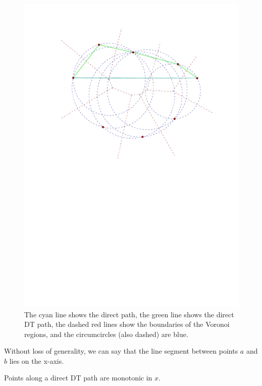 \documentclass{tufte-handout}
\begin{document}
\begin{figure}
  \includegraphics[scale=0.8]{figures/one-sided_path.pdf}
  \caption{The cyan line shows the direct path, the green line shows
    the direct DT path, the dashed red lines show the boundaries of
    the Voronoi regions, and the circumcircles (also dashed) are
    blue.}
\end{figure}

Without loss of generality, we can say that the line segment between
points $a$ and $b$ lies on the x-axis.

\newpage

\begin{Lemma}

  \label{lemma:monotonic:path}

  Points along a direct DT path are monotonic in $x$.

\end{Lemma}
\end{document}
